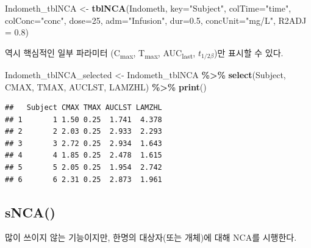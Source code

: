 \documentclass[
  11pt,
  krantz2, a4paper, twoside]{krantz}
\newenvironment{Shaded}{\begin{snugshade}}{\end{snugshade}}
\newcommand{\AttributeTok}[1]{\textcolor[rgb]{0.13,0.29,0.53}{#1}}
\newcommand{\CommentTok}[1]{\textcolor[rgb]{0.56,0.35,0.01}{\textit{#1}}}
\newcommand{\DecValTok}[1]{\textcolor[rgb]{0.00,0.00,0.81}{#1}}
\newcommand{\FloatTok}[1]{\textcolor[rgb]{0.00,0.00,0.81}{#1}}
\newcommand{\FunctionTok}[1]{\textcolor[rgb]{0.13,0.29,0.53}{\textbf{#1}}}
\newcommand{\NormalTok}[1]{#1}
\newcommand{\OtherTok}[1]{\textcolor[rgb]{0.56,0.35,0.01}{#1}}
\newcommand{\SpecialCharTok}[1]{\textcolor[rgb]{0.81,0.36,0.00}{\textbf{#1}}}
\newcommand{\StringTok}[1]{\textcolor[rgb]{0.31,0.60,0.02}{#1}}
\theoremstyle{definition}
\theoremstyle{definition}
\theoremstyle{definition}
\theoremstyle{definition}
\theoremstyle{remark}
\begin{document}
\begin{Shaded}
\begin{Highlighting}[]
\NormalTok{Indometh\_tblNCA }\OtherTok{\textless{}{-}} \FunctionTok{tblNCA}\NormalTok{(Indometh, }\AttributeTok{key=}\StringTok{"Subject"}\NormalTok{, }
                          \AttributeTok{colTime=}\StringTok{"time"}\NormalTok{, }\AttributeTok{colConc=}\StringTok{"conc"}\NormalTok{, }\AttributeTok{dose=}\DecValTok{25}\NormalTok{, }
                          \AttributeTok{adm=}\StringTok{"Infusion"}\NormalTok{, }\AttributeTok{dur=}\FloatTok{0.5}\NormalTok{, }
                          \AttributeTok{concUnit=}\StringTok{"mg/L"}\NormalTok{, }\AttributeTok{R2ADJ =} \FloatTok{0.8}\NormalTok{)}
\end{Highlighting}
\end{Shaded}

역시 핵심적인 일부 파라미터 (C\textsubscript{max}, T\textsubscript{max}, AUC\textsubscript{last}, \(t_{1/2\beta}\))만 표시할 수 있다.

\begin{Shaded}
\begin{Highlighting}[]
\NormalTok{Indometh\_tblNCA\_selected }\OtherTok{\textless{}{-}}\NormalTok{ Indometh\_tblNCA }\SpecialCharTok{\%\textgreater{}\%} 
  \FunctionTok{select}\NormalTok{(Subject, CMAX, TMAX, AUCLST, LAMZHL) }\SpecialCharTok{\%\textgreater{}\%} 
  \FunctionTok{print}\NormalTok{()}
\end{Highlighting}
\end{Shaded}

\begin{verbatim}
##   Subject CMAX TMAX AUCLST LAMZHL
## 1       1 1.50 0.25  1.741  4.378
## 2       2 2.03 0.25  2.933  2.293
## 3       3 2.72 0.25  2.934  1.643
## 4       4 1.85 0.25  2.478  1.615
## 5       5 2.05 0.25  1.954  2.742
## 6       6 2.31 0.25  2.873  1.961
\end{verbatim}

\subsection{sNCA()}\label{snca}

많이 쓰이지 않는 기능이지만, 한명의 대상자(또는 개체)에 대해 NCA를 시행한다.

\begin{Shaded}
\end{Shaded}
\end{document}
